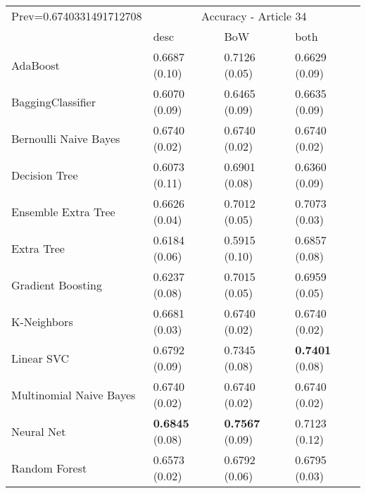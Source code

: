 \begin{tabular}{|l|l|l|l| }
\hline
Prev=0.6740331491712708 &  \multicolumn{3}{c|}{Accuracy - Article 34} \\
\cline{2-4} & desc & BoW & both \\ \hline
AdaBoost                & 0.6687 (0.10) & 0.7126 (0.05) & 0.6629 (0.09)\\
BaggingClassifier       & 0.6070 (0.09) & 0.6465 (0.09) & 0.6635 (0.09)\\
Bernoulli Naive Bayes   & 0.6740 (0.02) & 0.6740 (0.02) & 0.6740 (0.02)\\
Decision Tree           & 0.6073 (0.11) & 0.6901 (0.08) & 0.6360 (0.09)\\
Ensemble Extra Tree     & 0.6626 (0.04) & 0.7012 (0.05) & 0.7073 (0.03)\\
Extra Tree              & 0.6184 (0.06) & 0.5915 (0.10) & 0.6857 (0.08)\\
Gradient Boosting       & 0.6237 (0.08) & 0.7015 (0.05) & 0.6959 (0.05)\\
K-Neighbors             & 0.6681 (0.03) & 0.6740 (0.02) & 0.6740 (0.02)\\
Linear SVC              & 0.6792 (0.09) & 0.7345 (0.08) & {\bf 0.7401} (0.08)\\
Multinomial Naive Bayes & 0.6740 (0.02) & 0.6740 (0.02) & 0.6740 (0.02)\\
Neural Net              & {\bf 0.6845} (0.08) & {\bf 0.7567} (0.09) & 0.7123 (0.12)\\
Random Forest           & 0.6573 (0.02) & 0.6792 (0.06) & 0.6795 (0.03)\\
\hline
\end{tabular}